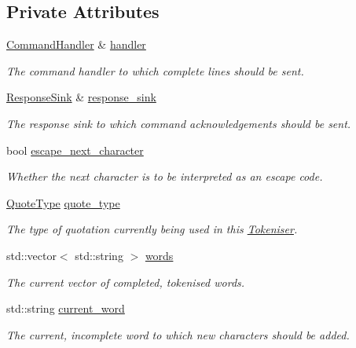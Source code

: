 \subsection*{Private Attributes}
\begin{DoxyCompactItemize}
\item 
\hypertarget{classTokeniser_a779dcc74539e27d10b7d2118fae996e6}{\hyperlink{classCommandHandler}{Command\+Handler} \& \hyperlink{classTokeniser_a779dcc74539e27d10b7d2118fae996e6}{handler}}\label{classTokeniser_a779dcc74539e27d10b7d2118fae996e6}

\begin{DoxyCompactList}\small\item\em The command handler to which complete lines should be sent. \end{DoxyCompactList}\item 
\hyperlink{classResponseSink}{Response\+Sink} \& \hyperlink{classTokeniser_a5ae6a740655de2f1cbc5f6723dd56439}{response\+\_\+sink}
\begin{DoxyCompactList}\small\item\em The response sink to which command acknowledgements should be sent. \end{DoxyCompactList}\item 
bool \hyperlink{classTokeniser_ace181afc0f1425b87126becc79458edd}{escape\+\_\+next\+\_\+character}
\begin{DoxyCompactList}\small\item\em Whether the next character is to be interpreted as an escape code. \end{DoxyCompactList}\item 
\hypertarget{classTokeniser_a10b7147e055edd438fcb951fc41faf65}{\hyperlink{classTokeniser_a71d622e60fae9d6c36c96ba69a4f62e4}{Quote\+Type} \hyperlink{classTokeniser_a10b7147e055edd438fcb951fc41faf65}{quote\+\_\+type}}\label{classTokeniser_a10b7147e055edd438fcb951fc41faf65}

\begin{DoxyCompactList}\small\item\em The type of quotation currently being used in this \hyperlink{classTokeniser}{Tokeniser}. \end{DoxyCompactList}\item 
\hypertarget{classTokeniser_ac87e935ecd591ec802e223ec341ebbfb}{std\+::vector$<$ std\+::string $>$ \hyperlink{classTokeniser_ac87e935ecd591ec802e223ec341ebbfb}{words}}\label{classTokeniser_ac87e935ecd591ec802e223ec341ebbfb}

\begin{DoxyCompactList}\small\item\em The current vector of completed, tokenised words. \end{DoxyCompactList}\item 
std\+::string \hyperlink{classTokeniser_a5d703e64476ccc8cbf42cc7c3ef8bc79}{current\+\_\+word}
\begin{DoxyCompactList}\small\item\em The current, incomplete word to which new characters should be added. \end{DoxyCompactList}\end{DoxyCompactItemize}


